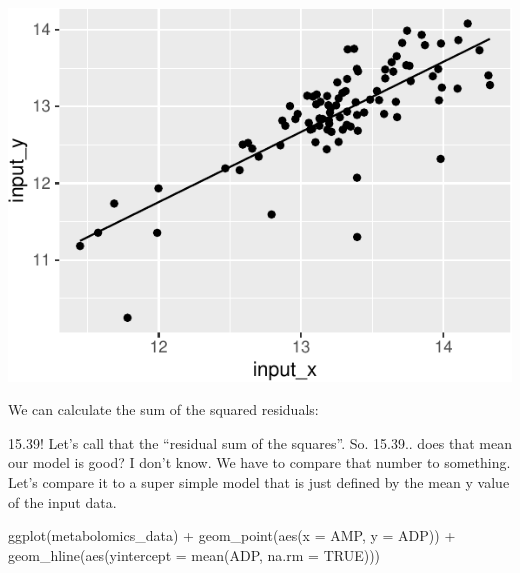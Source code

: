 \documentclass[
]{krantz}
\newenvironment{Shaded}{\begin{snugshade}}{\end{snugshade}}
\newcommand{\AttributeTok}[1]{\textcolor[rgb]{0.77,0.63,0.00}{#1}}
\newcommand{\ConstantTok}[1]{\textcolor[rgb]{0.00,0.00,0.00}{#1}}
\newcommand{\DecValTok}[1]{\textcolor[rgb]{0.00,0.00,0.81}{#1}}
\newcommand{\DocumentationTok}[1]{\textcolor[rgb]{0.56,0.35,0.01}{\textbf{\textit{#1}}}}
\newcommand{\FunctionTok}[1]{\textcolor[rgb]{0.00,0.00,0.00}{#1}}
\newcommand{\NormalTok}[1]{#1}
\newcommand{\SpecialCharTok}[1]{\textcolor[rgb]{0.00,0.00,0.00}{#1}}
\begin{document}
\begin{center}\includegraphics{index_files/figure-latex/unnamed-chunk-124-1} \end{center}

We can calculate the sum of the squared residuals:

\begin{Shaded}
\end{Shaded}

15.39! Let's call that the ``residual sum of the squares''. So. 15.39.. does that mean our model is good? I don't know. We have to compare that number to something. Let's compare it to a super simple model that is just defined by the mean y value of the input data.

\begin{Shaded}
\begin{Highlighting}[]
\FunctionTok{ggplot}\NormalTok{(metabolomics\_data) }\SpecialCharTok{+}
  \FunctionTok{geom\_point}\NormalTok{(}\FunctionTok{aes}\NormalTok{(}\AttributeTok{x =}\NormalTok{ AMP, }\AttributeTok{y =}\NormalTok{ ADP)) }\SpecialCharTok{+}
  \FunctionTok{geom\_hline}\NormalTok{(}\FunctionTok{aes}\NormalTok{(}\AttributeTok{yintercept =} \FunctionTok{mean}\NormalTok{(ADP, }\AttributeTok{na.rm =} \ConstantTok{TRUE}\NormalTok{)))}
\end{Highlighting}
\end{Shaded}
\end{document}
